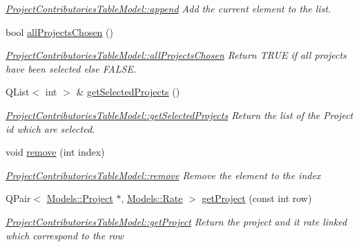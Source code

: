 \begin{DoxyCompactItemize}
\begin{DoxyCompactList}\small\item\em \hyperlink{classGui_1_1Widgets_1_1WdgModels_1_1ProjectContributoriesTableModel_a7bb1cd1299d72ce4d6a35cc38bff5a70}{Project\+Contributories\+Table\+Model\+::append} Add the current element to the list. \end{DoxyCompactList}\item 
bool \hyperlink{classGui_1_1Widgets_1_1WdgModels_1_1ProjectContributoriesTableModel_a2c7223dafc05fff7c0194820fd1e8ef8}{all\+Projects\+Chosen} ()
\begin{DoxyCompactList}\small\item\em \hyperlink{classGui_1_1Widgets_1_1WdgModels_1_1ProjectContributoriesTableModel_a2c7223dafc05fff7c0194820fd1e8ef8}{Project\+Contributories\+Table\+Model\+::all\+Projects\+Chosen} Return T\+R\+U\+E if all projects have been selected else F\+A\+L\+S\+E. \end{DoxyCompactList}\item 
Q\+List$<$ int $>$ \& \hyperlink{classGui_1_1Widgets_1_1WdgModels_1_1ProjectContributoriesTableModel_ab32f6d5b6e708b08cce0a83411f1eedc}{get\+Selected\+Projects} ()
\begin{DoxyCompactList}\small\item\em \hyperlink{classGui_1_1Widgets_1_1WdgModels_1_1ProjectContributoriesTableModel_ab32f6d5b6e708b08cce0a83411f1eedc}{Project\+Contributories\+Table\+Model\+::get\+Selected\+Projects} Return the list of the Project id which are selected. \end{DoxyCompactList}\item 
void \hyperlink{classGui_1_1Widgets_1_1WdgModels_1_1ProjectContributoriesTableModel_ae142b64f61cf2337cf3fcb3d6ce291ec}{remove} (int index)
\begin{DoxyCompactList}\small\item\em \hyperlink{classGui_1_1Widgets_1_1WdgModels_1_1ProjectContributoriesTableModel_ae142b64f61cf2337cf3fcb3d6ce291ec}{Project\+Contributories\+Table\+Model\+::remove} Remove the element to the {\itshape index} \end{DoxyCompactList}\item 
Q\+Pair$<$ \hyperlink{classModels_1_1Project}{Models\+::\+Project} $\ast$, \hyperlink{classModels_1_1Rate}{Models\+::\+Rate} $>$ \hyperlink{classGui_1_1Widgets_1_1WdgModels_1_1ProjectContributoriesTableModel_af44a062f618d9c8b095bdb5170c1403b}{get\+Project} (const int row)
\begin{DoxyCompactList}\small\item\em \hyperlink{classGui_1_1Widgets_1_1WdgModels_1_1ProjectContributoriesTableModel_af44a062f618d9c8b095bdb5170c1403b}{Project\+Contributories\+Table\+Model\+::get\+Project} Return the project and it rate linked which correspond to the {\itshape row} \end{DoxyCompactList}\item 

\end{DoxyCompactItemize}
